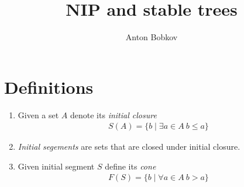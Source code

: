 \documentclass{amsart}
\begin{document}
\title{NIP and stable trees}
\author{Anton Bobkov}

\maketitle

\section{Definitions}

\begin{Definition}
	\begin{enumerate}
		\item Given a set $A$ denote its \emph{initial closure} 
		\begin{align*}
			S(A) = \{b \mid \exists a \in A \ b \leq a\}
		\end{align*}
		\item \emph{Initial segements} are sets that are closed under initial closure.
		\item Given initial segment $S$ define its \emph{cone}
		\begin{align*}
			F(S) = \{b \mid \forall a \in A \ b > a\}
		\end{align*}
	\end{enumerate}
\end{Definition}
\end{document}
